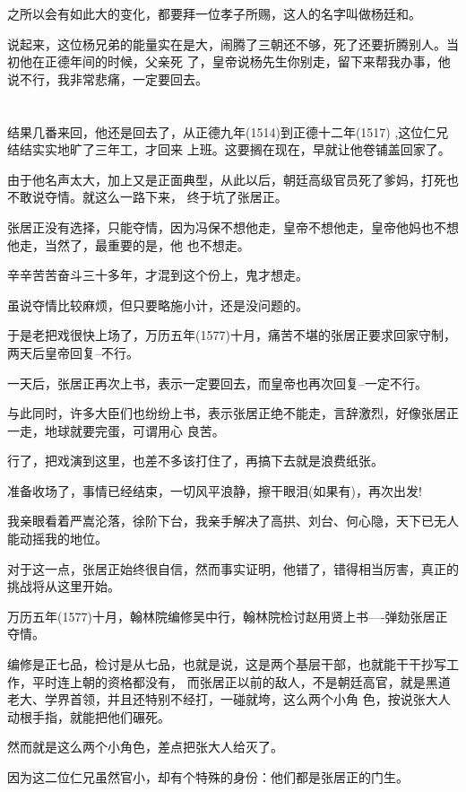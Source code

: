 \documentclass[11pt,a4paper,onecolumn]{article}
\begin{document}
之所以会有如此大的变化，都要拜一位孝子所赐，这人的名字叫做杨廷和。

说起来，这位杨兄弟的能量实在是大，闹腾了三朝还不够，死了还要折腾别人。当初他在正德年间的时候，父亲死
了，皇帝说杨先生你别走，留下来帮我办事，他说不行，我非常悲痛，一定要回去。

\section[\thesection]{}

结果几番来回，他还是回去了，从正德九年(1514)到正德十二年(1517) ,这位仁兄结结实实地旷了三年工，才回来
上班。这要搁在现在，早就让他卷铺盖回家了。

由于他名声太大，加上又是正面典型，从此以后，朝廷高级官员死了爹妈，打死也不敢说夺情。就这么一路下来，
终于坑了张居正。

张居正没有选择，只能夺情，因为冯保不想他走，皇帝不想他走，皇帝他妈也不想他走，当然了，最重要的是，他
也不想走。

辛辛苦苦奋斗三十多年，才混到这个份上，鬼才想走。

虽说夺情比较麻烦，但只要略施小计，还是没问题的。

于是老把戏很快上场了，万历五年(1577)十月，痛苦不堪的张居正要求回家守制，两天后皇帝回复--不行。

一天后，张居正再次上书，表示一定要回去，而皇帝也再次回复--一定不行。

与此同时，许多大臣们也纷纷上书，表示张居正绝不能走，言辞激烈，好像张居正一走，地球就要完蛋，可谓用心
良苦。

行了，把戏演到这里，也差不多该打住了，再搞下去就是浪费纸张。

准备收场了，事情已经结束，一切风平浪静，擦干眼泪(如果有)，再次出发!

我亲眼看着严嵩沦落，徐阶下台，我亲手解决了高拱、刘台、何心隐，天下已无人能动摇我的地位。

对于这一点，张居正始终很自信，然而事实证明，他错了，错得相当厉害，真正的挑战将从这里开始。

万历五年(1577)十月，翰林院编修吴中行，翰林院检讨赵用贤上书----弹劾张居正夺情。

编修是正七品，检讨是从七品，也就是说，这是两个基层干部，也就能干干抄写工作，平时连上朝的资格都没有，
而张居正以前的敌人，不是朝廷高官，就是黑道老大、学界首领，并且还特别不经打，一碰就垮，这么两个小角
色，按说张大人动根手指，就能把他们碾死。

然而就是这么两个小角色，差点把张大人给灭了。

因为这二位仁兄虽然官小，却有个特殊的身份：他们都是张居正的门生。
\end{document}

